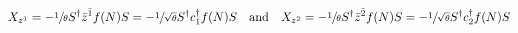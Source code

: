 \begin{equation} 
 X_{z^1}=-\sfrac{1}{\theta} S^\dagger \bar{z}^{\bar{1}}f(N)S
 =-\sfrac{1}{\sqrt{\theta}}S^\dagger c_1^\dagger
 f(N)S\quad\text{and}\quad
 X_{z^2}=-\sfrac{1}{\theta} S^\dagger \bar{z}^{\bar{2}}f(N)S
 =-\sfrac{1}{\sqrt{\theta}}S^\dagger c_2^\dagger f(N)S
\end{equation}

